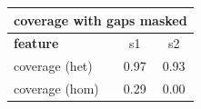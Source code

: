 \documentclass{standalone}
\begin{document}
\begin{tabular}{|l|c|c|}
\hline
\multicolumn{3}{|c|}{\textbf{coverage with gaps masked}}\\
\hline 

\textbf{feature} & s1 & s2 \\
\hline
coverage (het) & 0.97 & 0.93 \\
coverage (hom) & 0.29 & 0.00 \\
\hline
\end{tabular}
\end{document}
